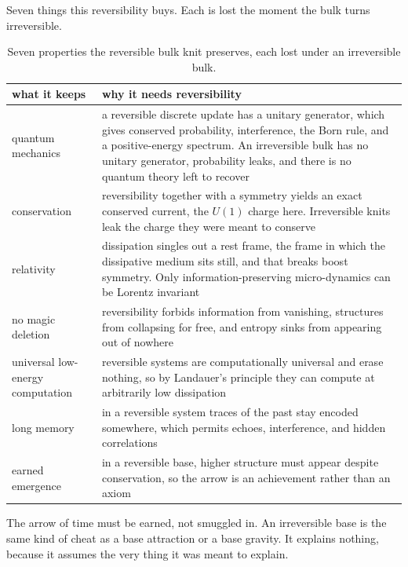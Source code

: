 Seven things this reversibility buys. Each is lost the moment the bulk turns irreversible.

\begin{table}[ht]
\centering
\begin{tabular}{@{}p{}p{}@{}}
\toprule
what it keeps & why it needs reversibility \\
\midrule
quantum mechanics & a reversible discrete update has a unitary generator, which gives conserved probability, interference, the Born rule, and a positive-energy spectrum. An irreversible bulk has no unitary generator, probability leaks, and there is no quantum theory left to recover \\
conservation & reversibility together with a symmetry yields an exact conserved current, the $U(1)$ charge here. Irreversible knits leak the charge they were meant to conserve \\
relativity & dissipation singles out a rest frame, the frame in which the dissipative medium sits still, and that breaks boost symmetry. Only information-preserving micro-dynamics can be Lorentz invariant \\
no magic deletion & reversibility forbids information from vanishing, structures from collapsing for free, and entropy sinks from appearing out of nowhere \\
universal low-energy computation & reversible systems are computationally universal and erase nothing, so by Landauer's principle they can compute at arbitrarily low dissipation \\
long memory & in a reversible system traces of the past stay encoded somewhere, which permits echoes, interference, and hidden correlations \\
earned emergence & in a reversible base, higher structure must appear despite conservation, so the arrow is an achievement rather than an axiom \\
\bottomrule
\end{tabular}
\caption{Seven properties the reversible bulk knit preserves, each lost under an irreversible bulk.}
\label{tab:reversibility-buys}
\end{table}

\begin{principle}
The arrow of time must be earned, not smuggled in. An irreversible base is the same kind of cheat as a base attraction or a base gravity. It explains nothing, because it assumes the very thing it was meant to explain.
\end{principle}

